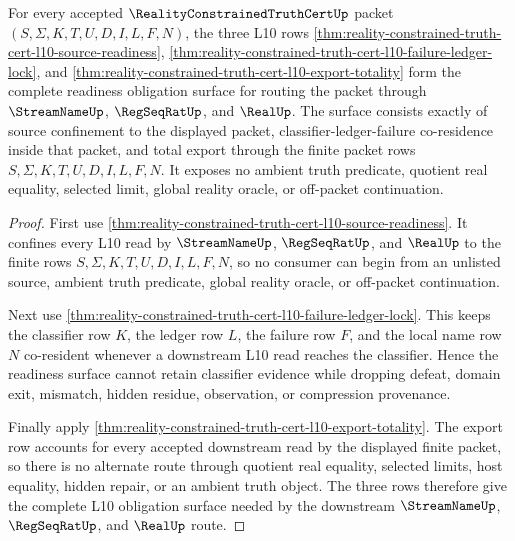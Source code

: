 \begin{theorem}
\label{thm:reality-constrained-truth-cert-l10-readiness-obligation-surface}
For every accepted $\RealityConstrainedTruthCertUp$ packet
$(S,\Sigma,K,T,U,D,I,L,F,N)$, the three L10 rows
\autoref{thm:reality-constrained-truth-cert-l10-source-readiness},
\autoref{thm:reality-constrained-truth-cert-l10-failure-ledger-lock}, and
\autoref{thm:reality-constrained-truth-cert-l10-export-totality} form the
complete readiness obligation surface for routing the packet through
$\StreamNameUp$, $\RegSeqRatUp$, and $\RealUp$. The surface consists exactly of
source confinement to the displayed packet, classifier-ledger-failure
co-residence inside that packet, and total export through the finite packet
rows $S,\Sigma,K,T,U,D,I,L,F,N$. It exposes no ambient truth predicate, quotient
real equality, selected limit, global reality oracle, or off-packet
continuation.
\end{theorem}
\begin{proof}
First use
\autoref{thm:reality-constrained-truth-cert-l10-source-readiness}. It confines
every L10 read by $\StreamNameUp$, $\RegSeqRatUp$, and $\RealUp$ to the finite
rows $S,\Sigma,K,T,U,D,I,L,F,N$, so no consumer can begin from an unlisted
source, ambient truth predicate, global reality oracle, or off-packet
continuation.

Next use
\autoref{thm:reality-constrained-truth-cert-l10-failure-ledger-lock}. This
keeps the classifier row $K$, the ledger row $L$, the failure row $F$, and the
local name row $N$ co-resident whenever a downstream L10 read reaches the
classifier. Hence the readiness surface cannot retain classifier evidence while
dropping defeat, domain exit, mismatch, hidden residue, observation, or
compression provenance.

Finally apply
\autoref{thm:reality-constrained-truth-cert-l10-export-totality}. The export
row accounts for every accepted downstream read by the displayed finite packet,
so there is no alternate route through quotient real equality, selected limits,
host equality, hidden repair, or an ambient truth object. The three rows
therefore give the complete L10 obligation surface needed by the downstream
$\StreamNameUp$, $\RegSeqRatUp$, and $\RealUp$ route.
\end{proof}

